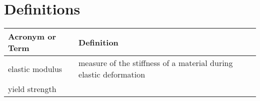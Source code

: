 \chapter{Definitions}



\begin{tabular}{l p{}}
\toprule
Acronym or Term  &  Definition \\

\midrule
elastic modulus  & measure of the stiffness of a material during elastic deformation \\
yield strength &
\bottomrule
\end{tabular}